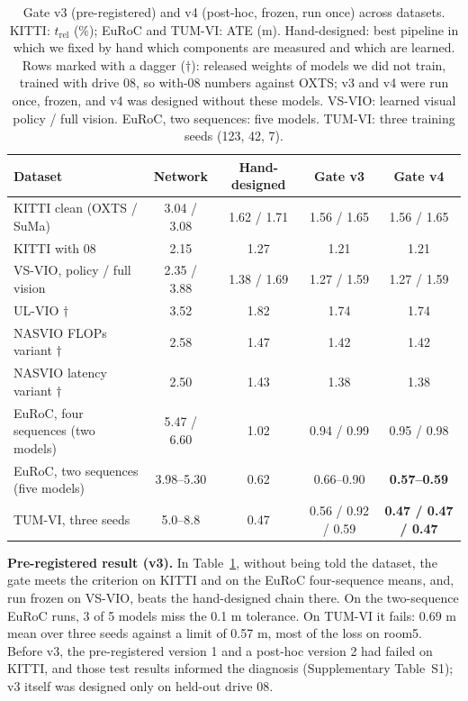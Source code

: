 \documentclass[pdflatex,sn-nature]{sn-jnl}
\newcommand{\tbf}[1]{\textbf{#1}}
\begin{document}
\begin{table}[t]
\caption{Gate v3 (pre-registered) and v4 (post-hoc, frozen, run once) across datasets. KITTI: $t_\mathrm{rel}$ (\%); EuRoC and TUM-VI: ATE (m). Hand-designed: best pipeline in which we fixed by hand which components are measured and which are learned. Rows marked with a dagger ($\dagger$): released weights of models we did not train, trained with drive 08, so with-08 numbers against OXTS; v3 and v4 were run once, frozen, and v4 was designed without these models. VS-VIO: learned visual policy / full vision. EuRoC, two sequences: five models. TUM-VI: three training seeds (123, 42, 7).}\label{tab:gate}
\footnotesize
\setlength{\tabcolsep}{2.3pt}
\begin{tabular}{@{}lcccc@{}}
\toprule
Dataset & Network & Hand-designed & Gate v3 & Gate v4 \\
\midrule
KITTI clean (OXTS / SuMa) & 3.04 / 3.08 & 1.62 / 1.71 & 1.56 / 1.65 & 1.56 / 1.65 \\
KITTI with 08 & 2.15 & 1.27 & 1.21 & 1.21 \\
VS-VIO\cite{Yang2022}, policy / full vision & 2.35 / 3.88 & 1.38 / 1.69 & 1.27 / 1.59 & 1.27 / 1.59 \\
UL-VIO\cite{Park2024ULVIO} $\dagger$ & 3.52 & 1.82 & 1.74 & 1.74 \\
NASVIO FLOPs variant\cite{Chen2023NASVIO} $\dagger$ & 2.58 & 1.47 & 1.42 & 1.42 \\
NASVIO latency variant\cite{Chen2023NASVIO} $\dagger$ & 2.50 & 1.43 & 1.38 & 1.38 \\
EuRoC, four sequences (two models) & 5.47 / 6.60 & 1.02 & 0.94 / 0.99 & 0.95 / 0.98 \\
EuRoC, two sequences (five models) & 3.98--5.30 & 0.62 & 0.66--0.90 & \tbf{0.57--0.59} \\
TUM-VI, three seeds & 5.0--8.8 & 0.47 & 0.56 / 0.92 / 0.59 & \tbf{0.47 / 0.47 / 0.47} \\
\bottomrule
\end{tabular}
\end{table}

\textbf{Pre-registered result (v3).} In Table~\ref{tab:gate}, without being told the dataset, the gate meets the criterion on KITTI and on the EuRoC four-sequence means, and, run frozen on VS-VIO, beats the hand-designed chain there. On the two-sequence EuRoC runs, 3 of 5 models miss the 0.1 m tolerance. On TUM-VI it fails: 0.69 m mean over three seeds against a limit of 0.57 m, most of the loss on room5. Before v3, the pre-registered version 1 and a post-hoc version 2 had failed on KITTI, and those test results informed the diagnosis (Supplementary Table~S1); v3 itself was designed only on held-out drive 08.
\end{document}
